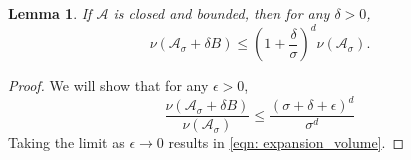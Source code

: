 \documentclass[11pt,twoside]{article}
\newtheorem{lemma}{Lemma}
\theoremstyle{definition}
\newcommand{\1}{\mathbbm{1}}
\newcommand{\Aset}{\mathcal{A}}
\newcommand{\Asig}{\Aset_{\sigma}}
\begin{document}
\begin{lemma}
	\label{lem: expansion_volume}
	If $\Aset$ is closed and bounded, then for any $\delta > 0$,
	\begin{equation}
	\label{eqn: expansion_volume}
	\nu(\Asig + \delta B) \leq \left(1 + \frac{\delta}{\sigma}\right)^d \nu(\Asig).
	\end{equation}
\end{lemma}
\begin{proof}
	We will show that for any $\epsilon > 0$, 
	\begin{equation}
	\label{eqn: ratio_of_volume}
	\frac{\nu(\Asig + \delta B)}{\nu(\Asig)} \leq \frac{(\sigma + \delta + \epsilon)^d}{\sigma^d}
	\end{equation}
	Taking the limit as $\epsilon \to 0$ results in \eqref{eqn: expansion_volume}.
	

\end{proof}
\end{document}

